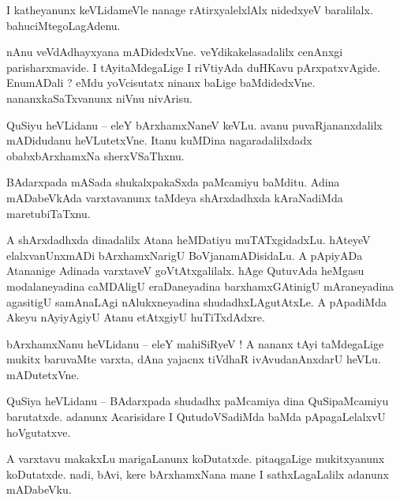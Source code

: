 \documentclass{article}
\begin{document}
\begin{mn}%
I katheyanunx keVLidameVle nanage rAtirxyalelxlAlx nidedxyeV baralilalx. bahuciMtegoLagAdenu.
\end{mn}

\begin{mn}%
nAnu veVdAdhayxyana mADidedxVne. veYdikakelasadalilx cenAnxgi parisharxmavide. I tAyitaMdegaLige I 
riVtiyAda duHKavu pArxpatxvAgide. EnumADali ? eMdu yoVcisutatx ninanx baLige baMdidedxVne. 
nananxkaSaTxvanunx niVnu nivArisu.
\end{mn}

\begin{mn}%
QuSiyu heVLidanu -- eleY bArxhamxNaneV keVLu. avanu puvaRjananxdalilx mADidudanu heVLutetxVne. 
Itanu kuMDina nagaradalilxdadx obabxbArxhamxNa sherxVSaThxnu.
\end{mn}

\begin{mn}%
BAdarxpada mASada shukalxpakaSxda paMcamiyu baMditu. Adina mADabeVkAda varxtavanunx taMdeya 
shArxdadhxda kAraNadiMda maretubiTaTxnu.
\end{mn}

\begin{mn}%
A shArxdadhxda dinadalilx Atana heMDatiyu muTATxgidadxLu. hAteyeV elalxvanUnxmADi bArxhamxNarigU 
BoVjanamADisidaLu. A pApiyADa Atananige Adinada varxtaveV goVtAtxgalilalx. hAge QutuvAda heMgasu 
modalaneyadina caMDAligU eraDaneyadina barxhamxGAtinigU  mAraneyadina agasitigU samAnaLAgi 
nAlukxneyadina shudadhxLAgutAtxLe. A pApadiMda Akeyu nAyiyAgiyU Atanu etAtxgiyU huTiTxdAdxre.
\end{mn}

\begin{mn}%
bArxhamxNanu heVLidanu -- eleY mahiSiRyeV ! A nananx tAyi taMdegaLige mukitx baruvaMte varxta, dAna 
yajacnx tiVdhaR ivAvudanAnxdarU heVLu. mADutetxVne.
\end{mn}

\begin{mn}%
QuSiya heVLidanu -- BAdarxpada shudadhx paMcamiya dina QuSipaMcamiyu barutatxde. adanunx 
Acarisidare I QutudoVSadiMda baMda pApagaLelalxvU hoVgutatxve.
\end{mn}

\begin{mn}%
A varxtavu makakxLu marigaLanunx koDutatxde. pitaqgaLige mukitxyanunx koDutatxde. nadi, bAvi, kere 
bArxhamxNana mane I sathxLagaLalilx adanunx mADabeVku.
\end{mn}
\end{document}
